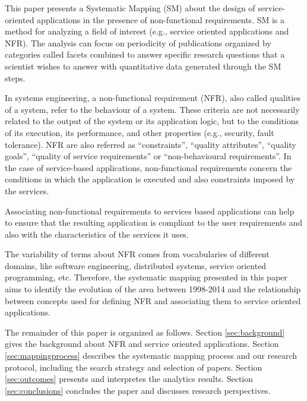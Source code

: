 This paper presents a Systematic Mapping (SM)  \cite{Petersen:2008} 
about the design of service-oriented applications in the presence of
non-functional requirements. SM is a  method for analyzing a field of interest (e.g., service oriented applications and NFR). The analysis can focus on
periodicity of publications organized by categories called facets combined to
answer  specific research questions  \cite{Budgen:2008}  that a scientist wishes to answer with quantitative data generated through the SM steps. 

In systems engineering, a non-functional requirement (NFR), also called qualities of a system, refer to the behaviour of a system. These criteria are not necessarily related to the output of the system or its application logic, but to the conditions of its  execution, its performance, and other properties (e.g., security, fault tolerance). NFR are also referred as
``constraints'', ``quality attributes'', ``quality goals'', ``quality of service
requirements'' or ``non-behavioural requirements''. In the case of service-based
applications, non-functional requirements concern the conditions in which the application is executed and also  constraints imposed by the services.

Associating non-functional requirements to services based applications can help to
ensure that the resulting application is compliant to the user requirements and
also with the characteristics of the services it uses. 
 
The variability of terms about NFR comes from vocabularies of different domains, like software engineering, distributed systems, service oriented programming, etc. Therefore, the systematic mapping presented in this paper aims to identify the evolution of the area between 1998-2014 and the
relationship between concepts used for defining NFR and associating them to service oriented applications.
 
The remainder of this paper is organized as follows. Section \ref{sec:background} gives
the background about NFR and service oriented applications. Section \ref{sec:mappingprocess}  describes the systematic mapping
process and our research protocol, including the search strategy and selection of papers. Section \ref{sec:outcomes} presents and interpretes the analytics results.
Section \ref{sec:conclusions} concludes the paper and discusses research perspectives. 
